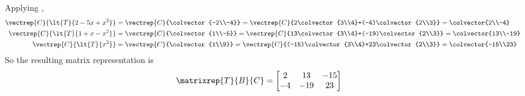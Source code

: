 Applying ,
%
\begin{align*}
\vectrep{C}{\lt{T}{2-5x+x^2}}&=\vectrep{C}{\colvector{-2\\-4}}
=\vectrep{C}{2\colvector{3\\4}+(-4)\colvector{2\\3}}=\colvector{2\\-4}\\
%
\vectrep{C}{\lt{T}{1+x-x^2}}&=\vectrep{C}{\colvector{1\\-5}}
=\vectrep{C}{13\colvector{3\\4}+(-19)\colvector{2\\3}}=\colvector{13\\-19}\\
%
\vectrep{C}{\lt{T}{x^2}}&=\vectrep{C}{\colvector{1\\9}}
=\vectrep{C}{(-15)\colvector{3\\4}+23\colvector{2\\3}}=\colvector{-15\\23}
%
\end{align*}
%
So the resulting matrix representation is
%
\begin{align*}
\matrixrep{T}{B}{C}
&=
\begin{bmatrix}
 2 & 13 & -15 \\
 -4 & -19 & 23
\end{bmatrix}
\end{align*}
